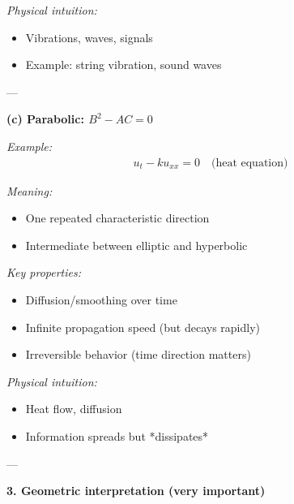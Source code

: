 \documentclass[12pt,a4paper]{report}
\begin{document}
\begin{description}
\begin{description}
\begin{description}
\begin{description}
\item \textit{Physical intuition:}

\begin{itemize}
\item Vibrations, waves, signals
\item Example: string vibration, sound waves
\end{itemize}
\end{description}

---

\item \textbf{(c) Parabolic: $B^2 - AC = 0$}

\begin{description}
\item \textit{Example:}
\begin{align*}
u_t - k u_{xx} = 0 \quad \text{(heat equation)}
\end{align*}

\item \textit{Meaning:}

\begin{itemize}
\item One repeated characteristic direction
\item Intermediate between elliptic and hyperbolic
\end{itemize}

\item \textit{Key properties:}

\begin{itemize}
\item Diffusion/smoothing over time
\item Infinite propagation speed (but decays rapidly)
\item Irreversible behavior (time direction matters)
\end{itemize}

\item \textit{Physical intuition:}

\begin{itemize}
\item Heat flow, diffusion
\item Information spreads but *dissipates*
\end{itemize}
\end{description}

---
\end{description}

\item \textbf{3. Geometric interpretation (very important)}


\end{description}
\end{description}
\end{document}
